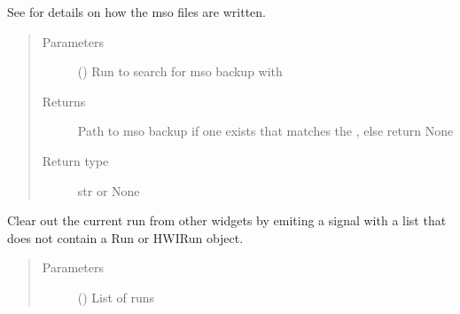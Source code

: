 \documentclass[letterpaper,10pt,english]{sphinxmanual}
\begin{document}
\begin{fulllineitems}
\begin{fulllineitems}
See {\hyperref[\detokenize{polo.widgets:polo.widgets.run_organizer.RunOrganizer.backup_classifications}]{}}
for details on how the mso files are written.
\begin{quote}\begin{description}
\item[{Parameters}] \leavevmode
{} ({\hyperref[\detokenize{polo.crystallography:polo.crystallography.run.HWIRun}]{}}) \textendash{} Run to search for mso backup with

\item[{Returns}] \leavevmode
Path to mso backup if one exists that matches the , else
return None

\item[{Return type}] \leavevmode
str or None

\end{description}\end{quote}

\end{fulllineitems}


\begin{fulllineitems}
\label{\detokenize{polo.widgets:polo.widgets.run_organizer.RunOrganizer._clear_current_run}}
Clear out the current run from other widgets by emiting a
 signal with a list that does not contain
a Run or HWIRun object.
\begin{quote}\begin{description}
\item[{Parameters}] \leavevmode
{} () \textendash{} List of runs

\end{description}\end{quote}

\end{fulllineitems}



\end{fulllineitems}
\end{document}
